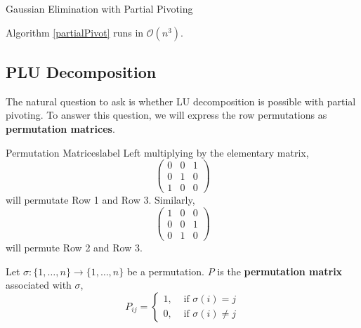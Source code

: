 \begin{algorithm}
	  \caption{Gaussian Elimination with Partial Pivoting}\label{partialPivot}
\end{algorithm}

\begin{rmk}
	Algorithm \ref{partialPivot} runs in $\mathcal{O}(n^3)$.
\end{rmk}

\subsection{PLU Decomposition}
The natural question to ask is whether LU decomposition is possible with partial pivoting. To answer this question, we will express the row permutations as \textbf{permutation matrices}.

\NewLine

\begin{ex}{Permutation Matrices}{label}
	Left multiplying by the elementary matrix,
	\[\left(\begin{array}{lll}
	0 & 0 & 1 \\
	0 & 1 & 0 \\
	1 & 0 & 0
	\end{array}\right)\]
will permutate Row 1 and Row 3. Similarly,
	\[\left(\begin{array}{lll}
	1 & 0 & 0 \\
	0 & 0 & 1 \\
	0 & 1 & 0
	\end{array}\right)\]
will permute Row 2 and Row 3.
\end{ex}

\begin{defn}[Permutation]
	Let $\sigma:\{1, \ldots, n\} \rightarrow\{1, \ldots, n\}$ be a permutation. $P$ is the \textbf{permutation matrix} associated with $\sigma$,
	\[P_{i j}= \begin{cases}1, & \text { if } \sigma(i)=j \\ 0, & \text { if } \sigma(i) \neq j\end{cases}\]
\end{defn}

